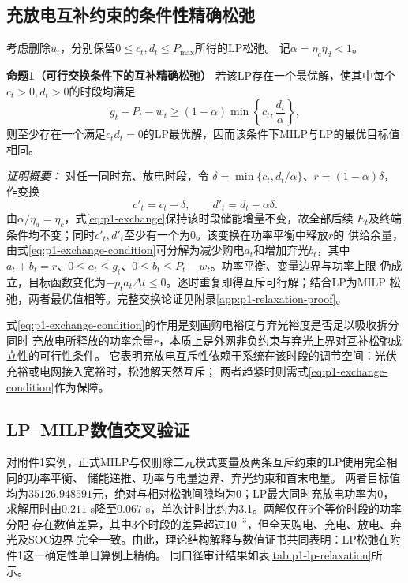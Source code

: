 \subsection{充放电互补约束的条件性精确松弛}
考虑删除$u_t$，分别保留$0\le c_t,d_t\le P_{\max}$所得的LP松弛。
记$\alpha=\eta_c\eta_d<1$。

\textbf{命题1（可行交换条件下的互补精确松弛）}
若该LP存在一个最优解，使其中每个$c_t>0,d_t>0$的时段均满足
\begin{equation}
 g_t+P_t-w_t\ge
 (1-\alpha)\min\left\{c_t,\frac{d_t}{\alpha}\right\},
 \label{eq:p1-exchange-condition}
\end{equation}
则至少存在一个满足$c_td_t=0$的LP最优解，因而该条件下MILP与LP的最优目标值相同。

\textit{证明概要：}
对任一同时充、放电时段，令
$\delta=\min\{c_t,d_t/\alpha\}$、$r=(1-\alpha)\delta$，作变换
\begin{equation}
 c'_t=c_t-\delta,\qquad d'_t=d_t-\alpha\delta.
 \label{eq:p1-exchange}
\end{equation}
由$\alpha/\eta_d=\eta_c$，式\eqref{eq:p1-exchange}保持该时段储能增量不变，故全部后续
$E_t$及终端条件均不变；同时$c'_t,d'_t$至少有一个为0。该变换在功率平衡中释放$r$的
供给余量，由式\eqref{eq:p1-exchange-condition}可分解为减少购电$a_t$和增加弃光$b_t$，其中
$a_t+b_t=r$、$0\le a_t\le g_t$、$0\le b_t\le P_t-w_t$。功率平衡、变量边界与功率上限
仍成立，目标函数变化为$-p_ta_t\Delta t\le0$。逐时重复即得互斥可行解；结合LP为MILP
松弛，两者最优值相等。完整交换论证见附录\ref{app:p1-relaxation-proof}。

式\eqref{eq:p1-exchange-condition}的作用是刻画购电裕度与弃光裕度是否足以吸收拆分同时
充放电所释放的功率余量$r$，本质上是外网非负约束与弃光上界对互补松弛成立性的可行性条件。
它表明充放电互斥性依赖于系统在该时段的调节空间：光伏充裕或电网接入宽裕时，松弛解天然互斥；
两者趋紧时则需式\eqref{eq:p1-exchange-condition}作为保障。

\subsection{LP--MILP数值交叉验证}
对附件1实例，正式MILP与仅删除二元模式变量及两条互斥约束的LP使用完全相同的功率平衡、
储能递推、功率与电量边界、弃光约束和首末电量。
两者目标值均为$35126.948591$元，绝对与相对松弛间隙均为0；LP最大同时充放电功率为0，
求解用时由$0.211$ s降至$0.067$ s，单次计时比约为3.1。两解仅在5个等价时段的功率分配
存在数值差异，其中3个时段的差异超过$10^{-3}$，但全天购电、充电、放电、弃光及SOC边界
完全一致。由此，理论结构解释与数值证书共同表明：LP松弛在附件1这一确定性单日算例上精确。
同口径审计结果如表\ref{tab:p1-lp-relaxation}所示。


